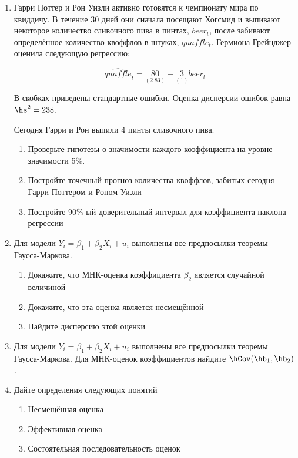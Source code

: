 \documentclass[12pt, a4paper]{article}
\theoremstyle{definition}
\begin{document}
\begin{enumerate}
\item Гарри Поттер и Рон Уизли активно готовятся к чемпионату мира по квиддичу. В течение 30 дней они сначала посещают Хогсмид и выпивают некоторое количество сливочного пива в пинтах, $beer_t$, после забивают определённое количество квоффлов в штуках, $quaffle_t$. Гермиона Грейнджер оценила следующую регрессию:

\[
\widehat{quaffle}_t = \underset{(2.83)}{80} - \underset{(1)}{3} beer_t
\]

В скобках приведены стандартные ошибки. Оценка дисперсии ошибок равна $\hs^2 = 238$.

Сегодня Гарри и Рон выпили 4 пинты сливочного пива.

\begin{enumerate}
\item Проверьте гипотезы о значимости каждого коэффициента на уровне значимости 5\%.
\item Постройте точечный прогноз количества квоффлов, забитых сегодня Гарри Поттером и Роном Уизли
\item Постройте 90\%-ый доверительный интервал для коэффициента наклона регрессии
\end{enumerate}



\item Для модели $Y_i = \beta_1 + \beta_2 X_i + u_i$ выполнены все предпосылки теоремы Гаусса-Маркова.
\begin{enumerate}
\item Докажите, что МНК-оценка коэффициента $\beta_2$ является случайной величиной
\item Докажите, что эта оценка является несмещённой
\item Найдите дисперсию этой оценки
\end{enumerate}



\item Для модели $Y_i = \beta_1 + \beta_2 X_i + u_i$ выполнены все предпосылки теоремы Гаусса-Маркова. Для МНК-оценок коэффициентов найдите $\hCov(\hb_1, \hb_2)$.


\item Дайте определения следующих понятий
\begin{enumerate}
\item Несмещённая оценка
\item Эффективная оценка
\item Состоятельная последовательность оценок
\end{enumerate}



\end{enumerate}
\end{document}
